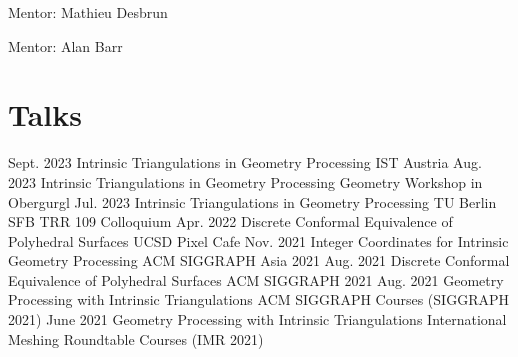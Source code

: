 \documentclass[11pt,letterpaper,roman]{moderncv}        %
\begin{document}
{Mentor: Mathieu Desbrun}
{} %

{Mentor: Alan Barr}
{}%



\section{Talks}
\cventry
    {Sept. 2023}
    {Intrinsic Triangulations in Geometry Processing}
    {IST Austria}{}{}
    {}
\cventry
    {Aug. 2023}
    {Intrinsic Triangulations in Geometry Processing}
    {Geometry Workshop in Obergurgl}{}{}
    {}
\cventry
    {Jul. 2023}
    {Intrinsic Triangulations in Geometry Processing}
    {TU Berlin SFB TRR 109 Colloquium}{}{}
    {}
\cventry
    {Apr. 2022}
    {Discrete Conformal Equivalence of Polyhedral Surfaces}
    {UCSD Pixel Cafe}{}{}
    {}
\cventry
    {Nov. 2021}
    {Integer Coordinates for Intrinsic Geometry Processing}
    {ACM SIGGRAPH Asia 2021}{}{}
    {}
\cventry
    {Aug. 2021}
    {Discrete Conformal Equivalence of Polyhedral Surfaces}
    {ACM SIGGRAPH 2021}{}{}
    {}
\cventry
    {Aug. 2021}
    {Geometry Processing with Intrinsic Triangulations}
    {ACM SIGGRAPH Courses (SIGGRAPH 2021)}{}{}
    {}
\cventry
    {June 2021}
    {Geometry Processing with Intrinsic Triangulations}
    {International Meshing Roundtable Courses (IMR 2021)}{}{}
    {}
\end{document}
